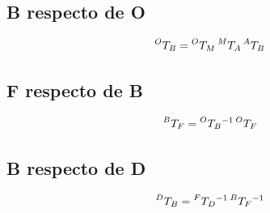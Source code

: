 \documentclass[a4paper,12pt]{article}
\begin{document}
\subsection{{B} respecto de {O}}
\[\prescript{O}{}{T_B} = \prescript{O}{}{T_M} \prescript{M}{}{T_A} \prescript{A}{}{T_B}\]

\subsection{{F} respecto de {B}}
\[\prescript{B}{}{T_F} = \prescript{O}{}{T_B}^{-1} \prescript{O}{}{T_F}\]

\subsection{{B} respecto de {D}}
\[\prescript{D}{}{T_B} = \prescript{F}{}{T_D}^{-1} \prescript{B}{}{T_F}^{-1} \]
\end{document}
